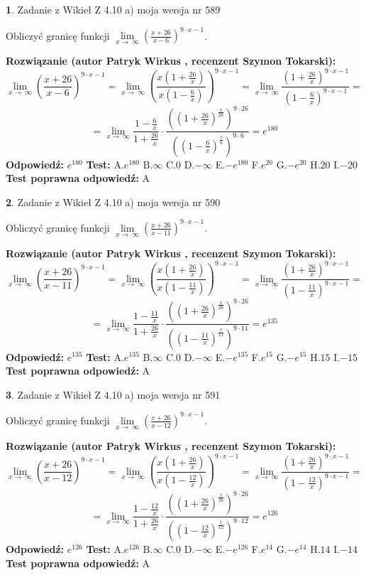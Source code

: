 \documentclass[12pt, a4paper]{article}
\theoremstyle{definition} %
\newtheorem{zad}{}
\newcommand{\zadStart}[1]{\begin{zad}#1\newline}
\newcommand{\zadStop}{\end{zad}}
\newcommand{\rozwStart}[2]{\noindent \textbf{Rozwiązanie (autor #1 , recenzent #2): }\newline}
\newcommand{\rozwStop}{\newline}
\newcommand{\odpStart}{\noindent \textbf{Odpowiedź:}\newline}
\newcommand{\odpStop}{\newline}
\newcommand{\testStart}{\noindent \textbf{Test:}\newline}
\newcommand{\testStop}{\newline}
\newcommand{\kluczStart}{\noindent \textbf{Test poprawna odpowiedź:}\newline}
\newcommand{\kluczStop}{\newline}
\begin{document}
\zadStart{Zadanie z Wikieł Z 4.10 a) moja wersja nr 589}

Obliczyć granicę funkcji  $\lim\limits_{x\to\ \infty}(\frac{x+26}{x-6})^{9\cdot x-1}$.
\zadStop
\rozwStart{Patryk Wirkus}{Szymon Tokarski}
$$\lim\limits_{x\to\ \infty}(\frac{x+26}{x-6})^{9\cdot x-1} = \lim\limits_{x\to\ \infty}(\frac{x(1+\frac{26}{x})}{x(1-\frac{6}{x})})^{9\cdot x-1}=\lim\limits_{x\to\ \infty}\frac{(1+\frac{26}{x})^{9\cdot x-1}}{(1-\frac{6}{x})^{9\cdot x-1}}=$$
$$=\lim\limits_{x\to\ \infty}\frac{1-\frac{6}{x}}{1+\frac{26}{x}}\cdot\frac{((1+\frac{26}{x})^{\frac{x}{26}})^{9\cdot26}}{((1-\frac{6}{x})^{\frac{x}{6}})^{9\cdot6}}=e^{180}$$
\rozwStop
\odpStart
$e^{180}$
\odpStop
\testStart
A.$e^{180}$ B.$\infty$ C.$0$ D.$-\infty$ E.$-e^{180}$
F.$e^{20}$ G.$-e^{20}$
H.$20$
I.$-20$
\testStop
\kluczStart
A
\kluczStop



\zadStart{Zadanie z Wikieł Z 4.10 a) moja wersja nr 590}

Obliczyć granicę funkcji  $\lim\limits_{x\to\ \infty}(\frac{x+26}{x-11})^{9\cdot x-1}$.
\zadStop
\rozwStart{Patryk Wirkus}{Szymon Tokarski}
$$\lim\limits_{x\to\ \infty}(\frac{x+26}{x-11})^{9\cdot x-1} = \lim\limits_{x\to\ \infty}(\frac{x(1+\frac{26}{x})}{x(1-\frac{11}{x})})^{9\cdot x-1}=\lim\limits_{x\to\ \infty}\frac{(1+\frac{26}{x})^{9\cdot x-1}}{(1-\frac{11}{x})^{9\cdot x-1}}=$$
$$=\lim\limits_{x\to\ \infty}\frac{1-\frac{11}{x}}{1+\frac{26}{x}}\cdot\frac{((1+\frac{26}{x})^{\frac{x}{26}})^{9\cdot26}}{((1-\frac{11}{x})^{\frac{x}{11}})^{9\cdot11}}=e^{135}$$
\rozwStop
\odpStart
$e^{135}$
\odpStop
\testStart
A.$e^{135}$ B.$\infty$ C.$0$ D.$-\infty$ E.$-e^{135}$
F.$e^{15}$ G.$-e^{15}$
H.$15$
I.$-15$
\testStop
\kluczStart
A
\kluczStop



\zadStart{Zadanie z Wikieł Z 4.10 a) moja wersja nr 591}

Obliczyć granicę funkcji  $\lim\limits_{x\to\ \infty}(\frac{x+26}{x-12})^{9\cdot x-1}$.
\zadStop
\rozwStart{Patryk Wirkus}{Szymon Tokarski}
$$\lim\limits_{x\to\ \infty}(\frac{x+26}{x-12})^{9\cdot x-1} = \lim\limits_{x\to\ \infty}(\frac{x(1+\frac{26}{x})}{x(1-\frac{12}{x})})^{9\cdot x-1}=\lim\limits_{x\to\ \infty}\frac{(1+\frac{26}{x})^{9\cdot x-1}}{(1-\frac{12}{x})^{9\cdot x-1}}=$$
$$=\lim\limits_{x\to\ \infty}\frac{1-\frac{12}{x}}{1+\frac{26}{x}}\cdot\frac{((1+\frac{26}{x})^{\frac{x}{26}})^{9\cdot26}}{((1-\frac{12}{x})^{\frac{x}{12}})^{9\cdot12}}=e^{126}$$
\rozwStop
\odpStart
$e^{126}$
\odpStop
\testStart
A.$e^{126}$ B.$\infty$ C.$0$ D.$-\infty$ E.$-e^{126}$
F.$e^{14}$ G.$-e^{14}$
H.$14$
I.$-14$
\testStop
\kluczStart
A
\kluczStop
\end{document}
